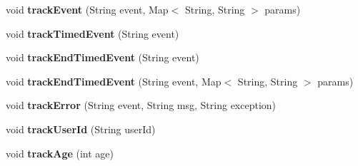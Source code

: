 \begin{DoxyCompactItemize}
\item 
\hypertarget{classcom_1_1spilgames_1_1framework_1_1tracking_1_1impl_1_1_set_tracker_a240889aa53ce1045a896b648ccdce7c6}{void {\bfseries track\-Event} (String event, Map$<$ String, String $>$ params)}\label{classcom_1_1spilgames_1_1framework_1_1tracking_1_1impl_1_1_set_tracker_a240889aa53ce1045a896b648ccdce7c6}

\item 
\hypertarget{classcom_1_1spilgames_1_1framework_1_1tracking_1_1impl_1_1_set_tracker_ae44e4ab6e4dd30b63a5a601202253da6}{void {\bfseries track\-Timed\-Event} (String event)}\label{classcom_1_1spilgames_1_1framework_1_1tracking_1_1impl_1_1_set_tracker_ae44e4ab6e4dd30b63a5a601202253da6}

\item 
\hypertarget{classcom_1_1spilgames_1_1framework_1_1tracking_1_1impl_1_1_set_tracker_aaa9a0f3a670c3ebbd088437d878b64b4}{void {\bfseries track\-End\-Timed\-Event} (String event)}\label{classcom_1_1spilgames_1_1framework_1_1tracking_1_1impl_1_1_set_tracker_aaa9a0f3a670c3ebbd088437d878b64b4}

\item 
\hypertarget{classcom_1_1spilgames_1_1framework_1_1tracking_1_1impl_1_1_set_tracker_ac55aa7a4db0591e6b3a0422be81d36ba}{void {\bfseries track\-End\-Timed\-Event} (String event, Map$<$ String, String $>$ params)}\label{classcom_1_1spilgames_1_1framework_1_1tracking_1_1impl_1_1_set_tracker_ac55aa7a4db0591e6b3a0422be81d36ba}

\item 
\hypertarget{classcom_1_1spilgames_1_1framework_1_1tracking_1_1impl_1_1_set_tracker_a29ffb13d90bb56790a590a0b871f2faa}{void {\bfseries track\-Error} (String event, String msg, String exception)}\label{classcom_1_1spilgames_1_1framework_1_1tracking_1_1impl_1_1_set_tracker_a29ffb13d90bb56790a590a0b871f2faa}

\item 
\hypertarget{classcom_1_1spilgames_1_1framework_1_1tracking_1_1impl_1_1_set_tracker_a11c79d6c05f1c30fc5cd09a7f2fe29a3}{void {\bfseries track\-User\-Id} (String user\-Id)}\label{classcom_1_1spilgames_1_1framework_1_1tracking_1_1impl_1_1_set_tracker_a11c79d6c05f1c30fc5cd09a7f2fe29a3}

\item 
\hypertarget{classcom_1_1spilgames_1_1framework_1_1tracking_1_1impl_1_1_set_tracker_aebc0017f2ef8493db7d09f541e0ab12b}{void {\bfseries track\-Age} (int age)}\label{classcom_1_1spilgames_1_1framework_1_1tracking_1_1impl_1_1_set_tracker_aebc0017f2ef8493db7d09f541e0ab12b}


\end{DoxyCompactItemize}
